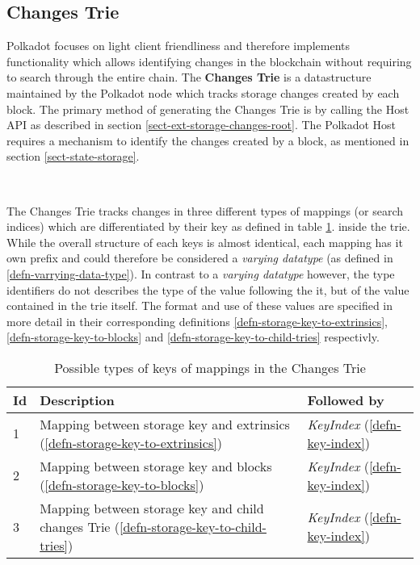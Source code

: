 \documentclass{book}
\newcommand{\tmem}[1]{{\em #1\/}}
\newcommand{\tmstrong}[1]{\textbf{#1}}
\newcommand{\tmtextbf}[1]{{\bfseries{#1}}}
\newcommand{\tmtextit}[1]{{\itshape{#1}}}
\newcommand{\tmtexttt}[1]{{\ttfamily{#1}}}
\newcommand{\tmverbatim}[1]{{\ttfamily{#1}}}
\providecommand{\tmem}[1]{\tmtextit{#1}}
\providecommand{\tmstrong}[1]{\tmtextbf{#1}}
\providecommand{\tmtextbf}[1]{\tmtextbf{#1}}
\providecommand{\tmtextit}[1]{\tmtextit{#1}}
\providecommand{\tmverbatim}[1]{\tmtexttt{#1}}
\begin{document}
\subsection{Changes Trie}\label{defn-changes-trie}

Polkadot focuses on light client friendliness and therefore implements
functionality which allows identifying changes in the blockchain without
requiring to search through the entire chain. The {\tmstrong{Changes Trie}} is
a datastructure maintained by the Polkadot node which tracks storage changes
created by each block. The primary method of generating the Changes Trie is by
calling the \tmverbatim{ext\_storage\_changes\_root} Host API as described in
section \ref{sect-ext-storage-changes-root}. The Polkadot Host requires a
mechanism to identify the changes created by a block, as mentioned in section
\ref{sect-state-storage}.

\

The Changes Trie tracks changes in three different types of mappings (or
search indices) which are differentiated by their key as defined in table
\ref{table-changes-trie-key-types}. inside the trie. While the overall
structure of each keys is almost identical, each mapping has it own prefix and
could therefore be considered a \tmtextit{varying datatype} (as defined in
\ref{defn-varrying-data-type}). In contrast to a \tmtextit{varying datatype}
however, the type identifiers do not describes the type of the value following
the it, but of the value contained in the trie itself. The format and use of
these values are specified in more detail in their corresponding definitions
\ref{defn-storage-key-to-extrinsics}, \ref{defn-storage-key-to-blocks} and
\ref{defn-storage-key-to-child-tries} respectivly.{\hspace*{\fill}}

\begin{table}[h]
  \begin{tabular}{lll}
    \hline
    {\tmstrong{Id}} & {\tmstrong{Description}} & {\tmstrong{Followed by}}\\
    \hline
    1 & Mapping between storage key and extrinsics
    (\ref{defn-storage-key-to-extrinsics}) & {\tmem{KeyIndex}}
    (\ref{defn-key-index})\\
    \hline
    2 & Mapping between storage key and blocks
    (\ref{defn-storage-key-to-blocks}) & {\tmem{KeyIndex}}
    (\ref{defn-key-index})\\
    \hline
    3 & Mapping between storage key and child changes Trie
    (\ref{defn-storage-key-to-child-tries}) & {\tmem{KeyIndex}}
    (\ref{defn-key-index})\\
    \hline
  \end{tabular}
  
  \
  \caption{\label{table-changes-trie-key-types}Possible types of keys of
  mappings in the Changes Trie}
\end{table}
\end{document}

